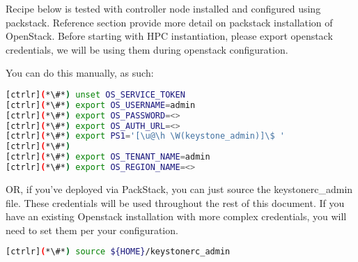 Recipe below is tested with controller node installed and configured using packstack.
Reference section provide more detail on packstack installation of OpenStack.
Before starting with HPC instantiation, please export openstack credentials, we will be using them during openstack configuration. 

You can do this manually, as such:

\begin{lstlisting}[language=bash,keywords={}]
[ctrlr](*\#*) unset OS_SERVICE_TOKEN
[ctrlr](*\#*) export OS_USERNAME=admin
[ctrlr](*\#*) export OS_PASSWORD=<>
[ctrlr](*\#*) export OS_AUTH_URL=<>
[ctrlr](*\#*) export PS1='[\u@\h \W(keystone_admin)]\$ '
[ctrlr](*\#*) 
[ctrlr](*\#*) export OS_TENANT_NAME=admin
[ctrlr](*\#*) export OS_REGION_NAME=<>  
\end{lstlisting}

OR, if you've deployed via PackStack, you can just source the keystonerc\_admin file. These credentials will be used throughout the rest of this document. If you have an existing Openstack installation with more complex credentials, you will need to set them per your configuration.

\begin{lstlisting}[language=bash,keywords={}]
[ctrlr](*\#*) source ${HOME}/keystonerc_admin
\end{lstlisting}
